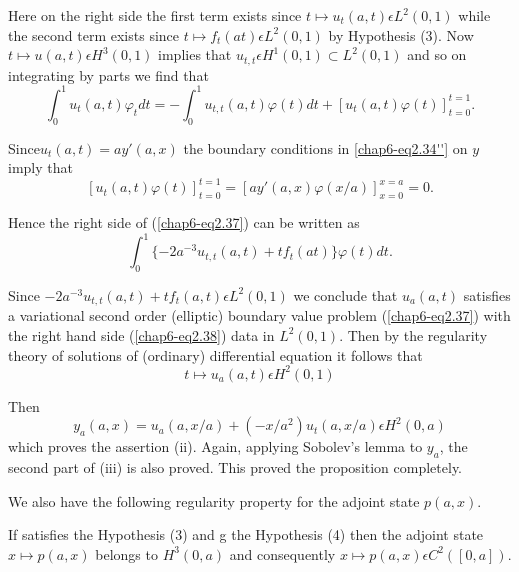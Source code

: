 Here on the right side the first term exists since $t \mapsto u_{t}(a,
t) \epsilon L^{2} (0, 1)$ while the second term exists since $t
\mapsto f_{t} (at) \epsilon L^{2} (0, 1)$ by Hypothesis (3). Now $t
\mapsto u(a, t) \epsilon H^{3} (0, 1)$ implies that $u_{t, t} \epsilon
H^{1} (0, 1) \subset L^{2}(0, 1)$ and so on integrating by parts we
find that 
$$
\int_{0}^{1} u_{t} (a, t)\varphi_{t} dt = -\int_{0}^{1} u_{t, t} (a,
t) \varphi(t) dt + [u_{t} (a, t) \varphi (t)]_{t=0}^{t=1}.  
$$

Since\pageoriginale $u_{t} (a, t) = a y'(a, x)$ the boundary
conditions in \ref{chap6-eq2.34''} on $y$ imply that 
$$
[u_{t}(a, t) \varphi(t)]_{t=0}^{t=1} = [ay' (a, x) \varphi
  (x/a)]_{x=0}^{x=a} = 0. 
$$

Hence the right side of (\ref{chap6-eq2.37}) can be written as
\begin{equation*}
\int_{0}^{1} \{-2a^{-3} u_{t, t} (a, t) + t f_{t} (at) \} \varphi (t)
dt.\tag{2.38}\label{chap6-eq2.38} 
\end{equation*}

Since $-2a^{-3} u_{t, t} (a, t) + t f_{t} (a, t) \epsilon L^{2} (0,
1)$ we conclude that $u_{a} (a, t)$ satisfies a variational second
order (elliptic) boundary value problem (\ref{chap6-eq2.37}) with the
right hand side (\ref{chap6-eq2.38}) data in $L^{2}(0, 1)$. Then by
the regularity theory of solutions of (ordinary) differential equation
it follows that 
\begin{equation*}
t \mapsto u_{a} (a, t) \epsilon H^{2} (0, 1)\tag{2.39}\label{chap6-eq2.39}
\end{equation*}

Then 
\begin{equation*}
y_{a} (a, x) = u_{a} (a, x/a) + (-x/a^{2}) u_{t} (a, x/a) \epsilon H^{2} (0, a)\tag*{$(2.39)'$}\label{chap6-eq2.39'}
\end{equation*}
which proves the assertion (ii). Again, applying Sobolev's lemma to $y_{a}$, the second part of (iii) is also proved. This proved the proposition completely.

We also have the following regularity property for the adjoint state $p(a, x)$.

\begin{proposition}\label{chap6-prop2.2}
If satisfies the Hypothesis (3) and g the Hypothesis (4) then the adjoint state $x \mapsto p(a, x)$ belongs to $H^{3} (0, a)$ and consequently $x \mapsto p(a, x) \epsilon C^{2} ([0, a])$.
\end{proposition}

